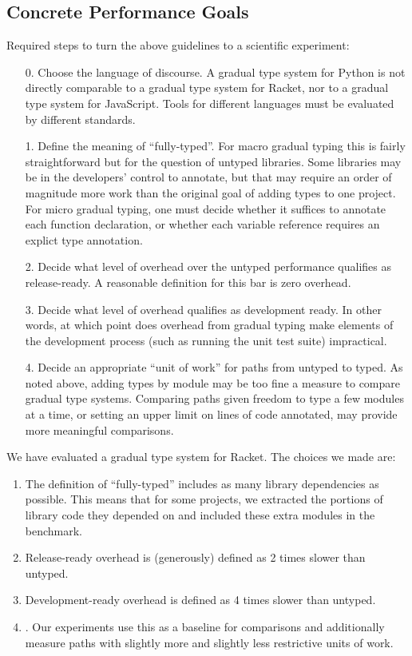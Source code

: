 \documentclass{article}
\begin{document}
\subsection{Concrete Performance Goals}
Required steps to turn the above guidelines to a scientific experiment:
\begin{enumerate}
\item[0.]
  Choose the language of discourse.
  A gradual type system for Python is not directly comparable to a gradual type system for Racket, nor to a gradual type system for JavaScript.
  Tools for different languages must be evaluated by different standards.
\item[1.]
  Define the meaning of ``fully-typed''.
  For macro gradual typing this is fairly straightforward but for the question of untyped libraries.
  Some libraries may be in the developers' control to annotate, but that may require an order of magnitude more work than the original goal of adding types to one project.
  For micro gradual typing, one must decide whether it suffices to annotate each function declaration, or whether each variable reference requires an explict type annotation.
\item[2.]
  Decide what level of overhead over the untyped performance qualifies as release-ready.
  A reasonable definition for this bar is zero overhead.
\item[3.]
  Decide what level of overhead qualifies as development ready.
  In other words, at which point does overhead from gradual typing make elements of the development process (such as running the unit test suite) impractical.
\item[4.]
  Decide an appropriate ``unit of work'' for paths from untyped to typed.
  As noted above, adding types by module may be too fine a measure to compare gradual type systems.
  Comparing paths given freedom to type a few modules at a time, or setting an upper limit on lines of code annotated, may provide more meaningful comparisons.
\end{enumerate}

We have evaluated a gradual type system for Racket.
The choices we made are:
\begin{enumerate}
\item
  The definition of ``fully-typed'' includes as many library dependencies as possible.
  This means that for some projects, we extracted the portions of library code they depended on and included these extra modules in the benchmark.
\item
  Release-ready overhead is (generously) defined as 2 times slower than untyped.
\item
  Development-ready overhead is defined as 4 times slower than untyped.
\item
  .
  Our experiments use this as a baseline for comparisons and additionally measure paths with slightly more and slightly less restrictive units of work.
\end{enumerate}
\end{document}
